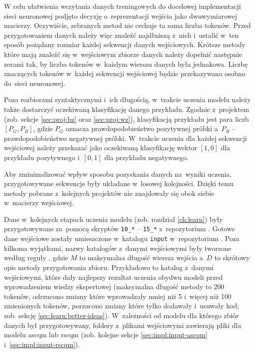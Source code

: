 \documentclass[twoside]{praca}
\begin{document}
W celu ułatwienia wczytania danych treningowych do docelowej implementacji sieci neuronowej
podjęto decyzję o~reprezentacji wejścia jako dwuwymiarowej macierzy. Oczywiście, zebranych metod nie cechuje ta sama liczba tokenów. Przed przygotowaniem danych należy więc znaleźć najdłuższą z~nich i~ustalić w~ten sposób pożądany rozmiar każdej sekwencji danych wejściowych. Krótsze metody które mają znaleźć się w~wejściowym zbiorze danych należy dopełnić następnie zerami tak, by liczba tokenów w~każdym wierszu danych była jednakowa. Liczbę znaczących tokenów w~każdej sekwencji wejściowej będzie przekazywana osobno do~sieci neuronowej.

Poza rozbiorami syntaktycznymi i~ich długością, w~trakcie uczenia modelu należy także dostarczyć oczekiwaną klasyfikację danego przykładu. Zgodnie z~projektem (zob. sekcje \ref{sec:proj:bz} oraz \ref{sec:proj:wz}), klasyfikacją przykładu jest para liczb $[P_G,P_B]$, gdzie $P_G$ oznacza prawdopodobieństwo pozytywnej próbki a~$P_B$ -- prawdopodobieństwo negatywnej próbki. W~trakcie uczenia dla każdej sekwencji wejściowej należy przekazać jako oczekiwaną klasyfikację wektor $[1,0]$ dla przykładu pozytywnego i~$[0,1]$ dla przykładu negatywnego.

Aby zminimalizować wpływ sposobu pozyskania danych na~wyniki uczenia, przygotowywane sekwencje były układane w~losowej kolejności. Dzięki temu metody pobrane z~kolejnych projektów nie znajdowały się obok siebie w~macierzy wejściowej.

Dane w~kolejnych etapach uczenia modelu (zob. rozdział \ref{ch:learn}) były przygotowywane za~pomocą skryptów \texttt{10\_*} -- \texttt{15\_*} z~repozytorium \cite{fracz:refactor-extractor}. Gotowe dane wejściowe zostały umieszczone w~katalogu \texttt{input} w~repozytorium \cite{fracz:code-quality-tf}. Poza kilkoma wyjątkami, nazwy katalogów z~danymi wejściowymi były tworzone według reguły , gdzie $M$ to maksymalna długość wiersza wejścia a~$D$ to skrótowy opis metody przygotowania zbioru. Przykładowo  to katalog z~danymi wejściowymi, które dały najlepszy rezultat uczenia obydwu modeli przed wprowadzeniem wiedzy ekspertowej (maksymalna długość metody to 200 tokenów, odrzucono zmiany które wprowadzały mniej niż 5 i~więcej niż 100 zmienionych tokenów, porzucono zmiany które tylko dodawały i~usuwały kod; zob. sekcję \ref{sec:learn:better-ideas}). W~zależności od modelu dla którego zbiór danych był przygotowywany, foldery z~plikami wejściowymi zawierają pliki dla modelu \gls{ascqm} lub \gls{rscqm} (zob. kolejne sekcje \ref{sec:impl:input-ascqm} i~\ref{sec:impl:input-rscqm}).
\end{document}
